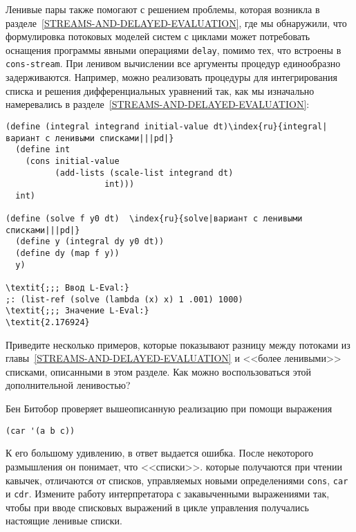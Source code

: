 Ленивые пары также помогают с решением проблемы, которая
возникла в разделе~\ref{STREAMS-AND-DELAYED-EVALUATION},
где мы обнаружили, что формулировка потоковых моделей систем с
циклами может потребовать оснащения программы явными операциями
{\tt delay}, 
помимо тех, что встроены в {\tt cons-stream}.  При
ленивом вычислении все аргументы процедур единообразно задерживаются.
Например, можно реализовать процедуры для интегрирования
списка и решения дифференциальных уравнений так, как мы изначально намеревались
в разделе~\ref{STREAMS-AND-DELAYED-EVALUATION}:

\begin{Verbatim}[fontsize=\small]
(define (integral integrand initial-value dt)\index{ru}{integral|вариант с ленивыми списками|||pd|}
  (define int
    (cons initial-value
          (add-lists (scale-list integrand dt)
                    int)))
  int)

(define (solve f y0 dt)  \index{ru}{solve|вариант с ленивыми списками|||pd|}
  (define y (integral dy y0 dt))
  (define dy (map f y))
  y)

\textit{;;; Ввод L-Eval:}
;: (list-ref (solve (lambda (x) x) 1 .001) 1000)
\textit{;;; Значение L-Eval:}
\textit{2.176924}
\end{Verbatim}

\begin{exercise}{4.32}%
\label{EX4.32}%
Приведите несколько примеров, которые показывают разницу
между потоками из главы~\ref{STREAMS-AND-DELAYED-EVALUATION}
и <<более ленивыми>> списками, описанными в этом разделе.  Как можно
воспользоваться этой дополнительной ленивостью?
\end{exercise}

\begin{exercise}{4.33}%
\label{EX4.33}%
Бен Битобор проверяет вышеописанную реализацию при помощи
выражения

\begin{Verbatim}[fontsize=\small]
(car '(a b c))
\end{Verbatim}
К его большому удивлению, в ответ выдается ошибка.  После некоторого
размышления он понимает, что <<списки>>. которые получаются при
чтении кавычек, отличаются от списков, управляемых новыми определениями
{\tt cons}, {\tt car} и {\tt cdr}. Измените
работу интерпретатора с закавыченными выражениями так, чтобы при вводе
списковых выражений в цикле управления получались настоящие ленивые
списки.
\end{exercise}

